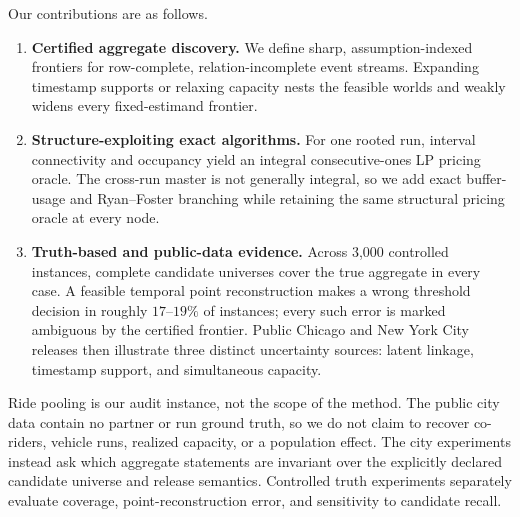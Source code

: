 Our contributions are as follows.
\begin{enumerate}[leftmargin=*,itemsep=1pt,topsep=2pt]
    \item \textbf{Certified aggregate discovery.}  We define sharp,
    assumption-indexed frontiers for row-complete, relation-incomplete event
    streams.  Expanding timestamp supports or relaxing capacity nests the
    feasible worlds and weakly widens every fixed-estimand frontier.
    \item \textbf{Structure-exploiting exact algorithms.}  For one rooted run,
    interval connectivity and occupancy yield an integral consecutive-ones LP
    pricing oracle.  The cross-run master is not generally integral, so we add
    exact buffer-usage and Ryan--Foster branching while retaining the same
    structural pricing oracle at every node.
    \item \textbf{Truth-based and public-data evidence.}  Across 3,000
    controlled instances, complete candidate universes cover the true
    aggregate in every case.  A feasible temporal point reconstruction makes a
    wrong threshold decision in roughly $17$--$19\%$ of instances; every such
    error is marked ambiguous by the certified frontier.  Public Chicago and
    New York City releases then illustrate three distinct uncertainty sources:
    latent linkage, timestamp support, and simultaneous capacity.
\end{enumerate}

Ride pooling is our audit instance, not the scope of the method.  The public
city data contain no partner or run ground truth, so we do not claim to recover
co-riders, vehicle runs, realized capacity, or a population effect.  The city
experiments instead ask which aggregate statements are invariant over the
explicitly declared candidate universe and release semantics.  Controlled
truth experiments separately evaluate coverage, point-reconstruction error,
and sensitivity to candidate recall.
